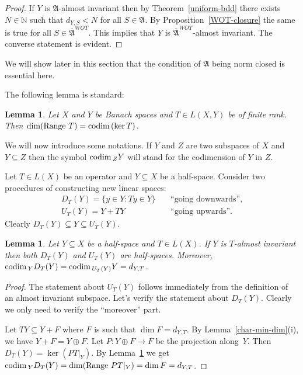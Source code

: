 \documentclass[12pt]{amsart}
\theoremstyle{plain}
\newtheorem{lemma}[theorem]{Lemma}
\theoremstyle{definition}
\theoremstyle{remark}
\begin{document}
\begin{proof}
If $Y$ is $\mathfrak A$-almost invariant then by Theorem~\ref{uniform-bdd} there exists $N\in\mathbb N$ such that $d_{Y,S}<N$ for all $S\in\mathfrak A$. By Proposition~\ref{WOT-closure} the same is true for all $S\in\overline{\mathfrak A}^{WOT}$. This implies that $Y$ is $\overline{\mathfrak A}^{WOT}$-almost invariant. The converse statement is evident.
\end{proof}

We will show later in this section that the condition of $\mathfrak A$ being norm closed is essential here.

The following lemma is standard:

\begin{lemma}\label{dim-codim}
Let $X$ and $Y$ be Banach spaces and $T\in L(X,Y)$ be of finite rank. Then $\dim({\rm Range}\ T)={{\rm codim}\,}(\ker T)$.
\end{lemma}

We will now introduce some notations. If $Y$ and $Z$ are two subspaces of $X$ and $Y\subseteq Z$ then the symbol ${{\rm codim}\,}_ZY$ will stand for the codimension of $Y$ in $Z$.

Let $T\in L(X)$ be an operator and $Y\subseteq X$ be a half-space. Consider two procedures of constructing new linear spaces:
$$
\begin{array}{ll}
D_T(Y)=\{y\in Y\colon Ty\in Y\}\quad & \mbox{``going downwards''},\\
U_T(Y)=Y+TY & \mbox{``going upwards''}.
\end{array}
$$
Clearly $D_T(Y)\subseteq Y\subseteq U_T(Y)$.

\begin{lemma}\label{procedures-hs}
Let $Y\subseteq X$ be a half-space and $T\in L(X)$. If $Y$ is $T$-almost invariant then both $D_T(Y)$ and $U_T(Y)$ are half-spaces. Moreover, ${{\rm codim}\,}_YD_T(Y)={{\rm codim}\,}_{U_T(Y)}Y=d_{Y,T}$.
\end{lemma}
\begin{proof}
The statement about $U_T(Y)$ follows immediately from the definition of an almost invariant subspace. Let's verify the statement about $D_T(Y)$. Clearly we only need to verify the ``moreover'' part.

Let $TY\subseteq Y+F$ where $F$ is such that $\dim F=d_{Y,T}$. By Lemma~\ref{char-min-dim}(i), we have $Y+F=Y\oplus F$. Let $P:Y\oplus F\to F$ be the projection along~$Y$. Then $D_T(Y)=\ker(PT|_Y)$. By Lemma~\ref{dim-codim} we get ${{\rm codim}\,}_YD_T(Y)=\dim({\rm Range}\ PT|_Y)=\dim F=d_{Y,T}$.
\end{proof}
\end{document}

